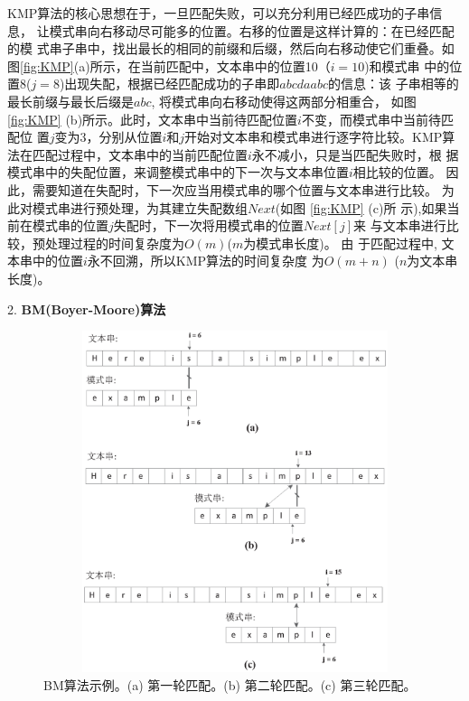 KMP算法的核心思想在于，一旦匹配失败，可以充分利用已经匹成功的子串信息，
让模式串向右移动尽可能多的位置。右移的位置是这样计算的：在已经匹配的模
式串子串中，找出最长的相同的前缀和后缀，然后向右移动使它们重叠。如
图\ref{fig:KMP}(a)所示，在当前匹配中，文本串中的位置10（$i=10$)和模式串
中的位置8($j=8$)出现失配，根据已经匹配成功的子串即$abcdaabc$的信息：该
子串相等的最长前缀与最长后缀是$abc$, 将模式串向右移动使得这两部分相重合，
如图 \ref{fig:KMP}
(b)所示。此时，文本串中当前待匹配位置$i$不变，而模式串中当前待匹配位
置$j$变为3，分别从位置$i$和$j$开始对文本串和模式串进行逐字符比较。KMP算
法在匹配过程中，文本串中的当前匹配位置$i$永不减小，只是当匹配失败时，根
据模式串中的失配位置，来调整模式串中的下一次与文本串位置$i$相比较的位置。
因此，需要知道在失配时，下一次应当用模式串的哪个位置与文本串进行比较。
为此对模式串进行预处理，为其建立失配数组$Next$(如图 \ref{fig:KMP} (c)所
示),如果当前在模式串的位置$j$失配时，下一次将用模式串的位置$Next[j]$来
与文本串进行比较，预处理过程的时间复杂度为$O(m)$($m$为模式串长度)。 由
于匹配过程中, 文本串中的位置$i$永不回溯，所以KMP算法的时间复杂度
为$O(m+n)$ ($n$为文本串长度)。

2. \textbf{BM(Boyer-Moore)算法}

\begin{figure}[H]
  \centering
  \includegraphics[height=10cm ,width=12cm]{figures/1_Introduction/BM.eps}
  \caption{BM算法示例。(a) 第一轮匹配。(b) 第二轮匹配。(c) 第三轮匹配。}
  \label{fig:BM}
\end{figure}

